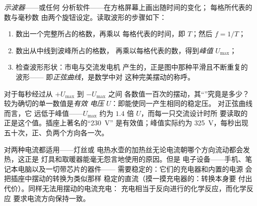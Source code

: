 \begin{method}[读取示波器波形]\label{met:g9:alternating-current:scope}
\emph{示波器}——或任何
分析软件——在方格屏幕上画出随时间的变化；
每格所代表的数与毫秒数
由两个旋钮设定。读取波形的步骤如下：
\begin{enumerate}
  \item 数出一个完整所占的格数，再乘以
        每格代表的时间，即 $T$；然后 $f = 1/T$；
  \item 数出从中线到波峰所占的格数，
        再乘以每格代表的数，得到\emph{峰值
        } $U_{\text{max}}$；
  \item 检查波形形状：市电与交流发电机
        产生的，正是图中那种平滑且不断重复的波形——
        即\emph{正弦曲线}，是数学中对
        这种完美摆动的称呼。
\end{enumerate}
\end{method}

\begin{proposition}[有效电压]\label{prop:g9:alternating-current:effective}
对于每秒经过从 $+U_{\text{max}}$ 到 $-U_{\text{max}}$ 之间
各数值一百次的摆动，其“”究竟是多少？
较为确切的单一数值是\emph{有效
电压} $U$：即能使同一产生相同的稳定压。
对正弦曲线而言，它
远低于峰值——$U_{\text{max}}$ 约为 $1.4$
倍 $U$，而每一只交流设计时所
要读取的正是这个值。插座上著名的“\qty{230}{V}”
是有效值；峰值实际约为
\qty{325}{V}，每秒出现五十次，正、负两个方向各一次。
\end{proposition}

\begin{example}[哪些器件在意电流方向]\label{ex:g9:alternating-current:whocares}
对两种电流都适用——灯丝或
电热水壶的加热丝无论电流朝哪个方向流动都会发热，这正是
灯具和取暖器能毫无怨言地使用的原因。但是
电子设备——手机、笔记本电脑以及一切带芯片的器件——
需要稳定的：它们的充电器和内置的电源
会把插座中摆动的转换为类似那样
稳定的直流（摸一摸充电器的：转换本身要
付出代价）。同样无法用摆动的电流充电：
充电相当于反向进行的化学反应，而化学反应
要求电流方向保持一致。
\end{example}

